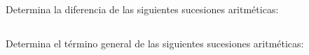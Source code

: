 \documentclass[12pt,addpoints]{evalua}
\begin{document}
\begin{questions}
      \subsection*{\else{}\fi}
      \question[4] Determina la diferencia de las siguientes sucesiones aritméticas:
      \begin{multicols}{2}
      \end{multicols}


      \subsection*{\else{}\fi}
      \question[4] Determina el término general de las siguientes sucesiones aritméticas:
      \begin{multicols}{2}
            \begin{parts}

\end{parts}
\end{multicols}
\end{questions}
\end{document}
